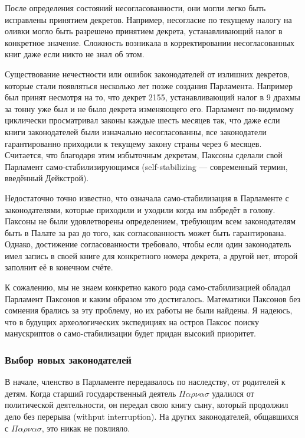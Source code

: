 \documentclass[12pt, a4paper]{article} %
\begin{document}
После определения состояний несогласованности, они могли легко быть исправлены принятием декретов. Например, несогласие по текущему налогу на оливки могло быть разрешено принятием декрета, устанавливающий налог в конкретное значение. Сложность возникала в корректировании несогласованных книг даже если никто не знал об этом. 

Существование нечестности или ошибок законодателей от излишних декретов, которые стали появляться несколько лет позже создания Парламента. Например
был принят несмотря на то, что декрет 2155, устанавливающий налог в 9 драхмы за тонну уже был и не было декрета изменяющего его. Парламент по-видимому циклически просматривал законы каждые шесть месяцев так, что даже если книги законодателей были изначально несогласованны, все законодатели гарантированно приходили к текущему закону страны через 6 месяцев. Считается, что благодаря этим избыточным декретам, Паксоны сделали свой Парламент само-стабилизирующимся (self-stabilizing --- современный термин, введённый Дейкстрой).

Недостаточно точно известно, что означала само-стабилизация в Парламенте с законодателями, которые приходили и уходили когда им взбредёт в голову. Паксоны не были удовлетворены определением, требующим всем законодателям быть в Палате за раз до того, как согласованность может быть гарантирована. Однако, достижение согласованности требовало, чтобы если один законодатель имел запись в своей книге для конкретного номера декрета, а другой нет, второй заполнит её в конечном счёте.

К сожалению, мы не знаем конкретно какого рода само-стабили\-зацией обладал Парламент Паксонов и каким образом это достигалось. Математики Паксонов без сомнения брались за эту проблему, но их работы не были найдены. Я надеюсь, что в будущих археологических экспедициях на остров Паксос поиску манускриптов о само-стабилизации будет придан высокий приоритет.

\subsubsection{Выбор новых законодателей}\label{sec:choosinglegist}

В начале, членство в Парламенте передавалось по наследству, от родителей к детям. Когда старший государственный деятель $\Pi\alpha\rho\nu\alpha\sigma$ удалился от политической деятельности, он передал свою книгу сыну, который продолжил дело без перерыва (withput interruption). На других законодателей, общавшихся с $\Pi\alpha\rho\nu\alpha\sigma$, это никак не повлияло.
\end{document}
